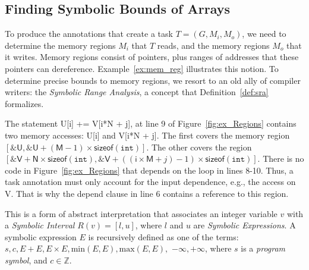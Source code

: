 \documentclass[sigplan,10pt,screen]{acmart}
\begin{document}
\subsection{Finding Symbolic Bounds of Arrays}
\label{sub:sra}

To produce the annotations that create a task $T = (G, M_i, M_o)$, we need to
determine the memory regions $M_i$ that $T$ reads, and the memory regions $M_o$
that it writes.
Memory regions consist of pointers, plus ranges of addresses that these pointers
can dereference.
Example~\ref{ex:mem_reg} illustrates this notion.
To determine precise bounds to memory regions, we resort to an old ally of
compiler writers: the {\em Symbolic Range Analysis}, a concept that
Definition~\ref{def:sra} formalizes.

\begin{example}
\label{ex:mem_reg}
The statement \textsf{U[i] += V[i*N + j]}, at line 9 of
Figure~\ref{fig:ex_Regions} contains two memory accesses: \textsf{U[i]} and
\textsf{V[i*N + j]}.
The first covers the memory region $[\mathtt{\&}\mathsf{U},
\mathtt{\&}\mathsf{U} + (\mathsf{M} - 1) \times \mathsf{sizeof}(\mathtt{int})]$.
The other covers the region
$[\mathtt{\&}\mathsf{V} + \mathsf{N} \times \mathsf{sizeof}(\mathtt{int}), \mathtt{\&}\mathsf{V} + ((\mathsf{i} \times \mathsf{M} + j) - 1) \times \mathsf{sizeof}(\mathtt{int})]$.
There is no code in Figure~\ref{fig:ex_Regions} that depends on the
loop in lines 8-10.
Thus, a task annotation must only account for the input dependence, e.g., the
access on \textsf{V}.
That is why the \textsf{depend} clause in line 6 contains a reference to this
region.
\end{example}

\begin{definition}
\label{def:sra}
This is a form of abstract interpretation that associates
an integer variable $v$ with a {\em Symbolic Interval} $R(v) = [l, u]$, where
$l$ and $u$ are {\em Symbolic Expressions}.
A symbolic expression $E$ is recursively defined as one of the terms:
$s, c, E + E, E \times E, \mbox{min}(E, E), \mbox{max}(E, E),$
$-\infty, +\infty$, where $s$ is a {\em program symbol}, and $c \in \mathbb{Z}$.
\end{definition}
\end{document}
